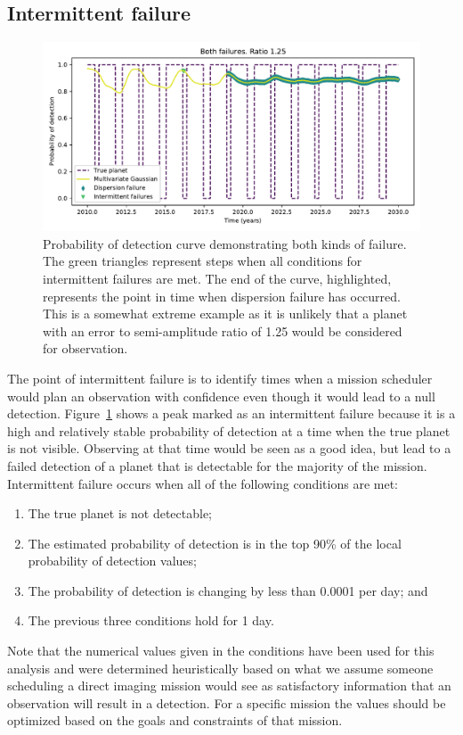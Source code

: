\subsection{Intermittent failure}%
\label{sub:intermittent_failure}
\begin{figure}[htpb]
    \centering
    \includegraphics[width=\linewidth]{ch1/figures/prob_det_vs_time_both_failure.pdf}
    \caption{Probability of detection curve demonstrating both kinds of failure. The green triangles represent steps
    when all conditions for intermittent failures are met. The end of the curve, highlighted,
    represents the point in time when dispersion failure has occurred. This is a somewhat
    extreme example as it is unlikely that a planet with an error to semi-amplitude ratio of 1.25
    would be considered for observation.}%
    \label{fig:figures/both_failures}
\end{figure}
The point of intermittent failure is to identify times when a mission scheduler would plan an
observation with confidence even though it would lead to a null detection.
Figure~\ref{fig:figures/both_failures} shows a peak marked as an intermittent failure because it is a
high and relatively stable probability of detection at a time when the true planet is not visible.
Observing at that time would be seen as a good idea, but lead to a failed detection of a planet that
is detectable for the majority of the mission. Intermittent failure occurs when all of
the following conditions are met:
\begin{enumerate}
    \item The true planet is not detectable;
    \item The estimated probability of detection is in the top 90\% of the local probability of
        detection values;
    \item The probability of detection is changing by less than 0.0001 per day; and
    \item The previous three conditions hold for 1 day.
\end{enumerate}
Note that the numerical values given in the conditions have been used for this analysis and were
determined heuristically based on what we assume someone scheduling a direct imaging mission would
see as satisfactory information that an observation will result in a detection. For a specific
mission the values should be optimized based on the goals and constraints of that mission.


